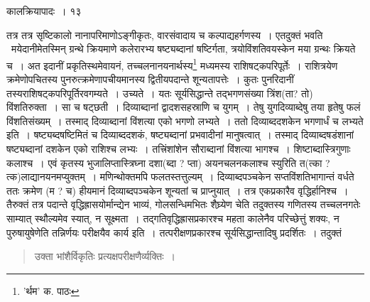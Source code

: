 \documentclass[11pt, openany]{book}
\begin{document}
\newpage

\vspace{3cm} \hspace{4cm}कालक्रियापादः~। \hspace{4cm}१३

\vspace{0.3cm}
\noindent तत्र तत्र सृष्टिकालो नानापरिमाणोऽङ्गीकृतः, वारसंवादाय च कल्पाद्यहर्गणस्य~। एतदुक्तं भवति \textendash\     मयेदानीमेतस्मिन् ग्रन्थे क्रियमाणे कलेरारभ्य षष्ट्यब्दानां षष्टिर्गता, त्रयोविंशतिवयस्केन मया ग्रन्थः क्रियते च~। अत इदानीं प्रकृतिस्थमेवायनं, तच्चलनानयनार्थस्य\renewcommand{\thefootnote}{१}\footnote{'र्थम' क. पाठः} मध्यमस्य राशिषट्कपरिपूर्तेः~। राशित्रयेण क्रमेणोपचितस्य पुनरुत्क्रमेणापचीयमानस्य द्वितीयपदान्ते शून्यतापत्तेः~। कुतः पुनरिदानीं तस्यराशिषट्कपरिपूर्तिरवगम्यते~। उच्यते~। यतः सूर्यसिद्धान्ते तद्भगणसंख्या त्रिंश(ता? तो) विंशतिरुक्ता~। सा च षट्छती~। दिव्याब्दानां द्वादशसहस्राणि च युगम्~। तेषु युगदिव्याब्देषु तया हृतेषु फलं विंशतिसंख्यम्~। तस्माद् दिव्याब्दानां विंशत्या एको भगणो लभ्यते~। ततो दिव्याब्ददशकेन भगणार्धं च लभ्यते इति~। षष्ट्यब्दषष्टिमितं च दिव्याब्ददशकं, षष्ट्यब्दानां प्रभवादीनां मानुषत्वात्~। तस्माद् दिव्याब्दषडंशानां षष्ट्यब्दानां दशकेन एको राशिश्च लभ्यः~। तत्त्रिंशांशेन सौराब्दानां विंशत्या भागश्च~। शिष्टाब्दास्त्रिगुणाः कलाश्च~। एवं कृतस्य भुजालिप्तास्त्रिघ्ना दशा(ब्दा ? प्ता) अयनचलनकलाश्च स्युरिति त(त्का ? त्क)लाद्यानयनमप्युक्तम्~। मणिन्थोक्तमपि फलतस्तत्तुल्यम्~। दिव्याब्दपञ्चकेन सप्तविंशतिभागान्तं वर्धते ततः क्रमेण (म ? च) हीयमानं दिव्याब्दपञ्चकेन शून्यतां च प्राप्नुयात्~। तत्र एकप्रकारैव
वृद्धिर्हानिश्च~। तैरुक्तं तत्र पदान्ते वृद्धिह्रासयोर्मान्द्येन भाव्यं, गोलसन्धिमभितः शैघ्र्येण चेति तदुक्तस्य गणितस्य तच्चलनगतेः साम्यात् स्थौल्यमेव
स्यात्, न सूक्ष्मता~। तद्गतिवृद्धिह्रासप्रकारश्च महता कालेनैव परिच्छेत्तुं शक्यः, न पुरुषायुषेणेति तन्निर्णयः परीक्षयैव कार्य इति~। तत्परीक्षणप्रकारश्च सूर्यसिद्धान्तादिषु प्रदर्शितः~। तदुक्तं\textendash 

\begin{quote}
{\qt उक्ता भांशैर्विकृतिः प्रत्यक्षपरीक्षणैर्व्यक्तिः~।}
\end{quote}
\end{document}
